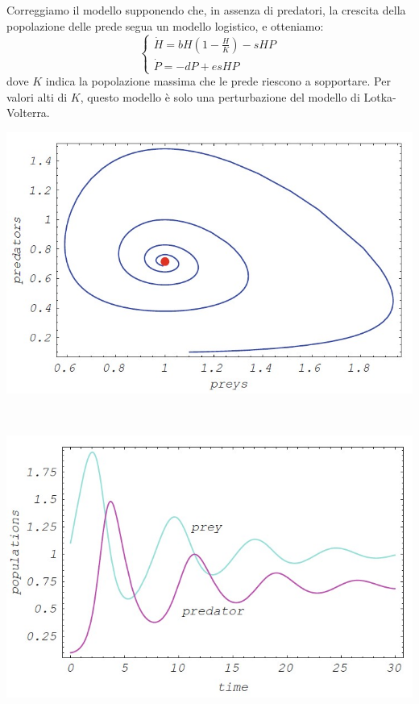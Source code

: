 \documentclass[12pt]{article}
\begin{document}
Correggiamo il modello supponendo che, in assenza di predatori, la crescita della popolazione delle prede segua un modello logistico, e otteniamo:
\begin{equation}
	\begin{cases}
		\dot{H} = bH\left(1-\frac{H}{K} \right) - sHP \\
		\dot{P} = -dP + esHP
	\end{cases}
\end{equation}
dove $K$ indica la popolazione massima che le prede riescono a sopportare. Per valori alti di $K$, questo modello è solo una perturbazione del modello di Lotka-Volterra. 
\begin{center}
  \begin{minipage}[b]{0.4\textwidth}
    \hspace{.5cm}\includegraphics[scale = .5]{Volterra3}
  \end{minipage}
  \ \ \ \ \ \ \ \ \ \ \ \ \ \ \ \ \ \ \
  \begin{minipage}[b]{0.4\textwidth}
    \hspace{-.7cm}\includegraphics[scale = .5]{Volterra4} 
  \end{minipage}
\end{center}
\end{document}
